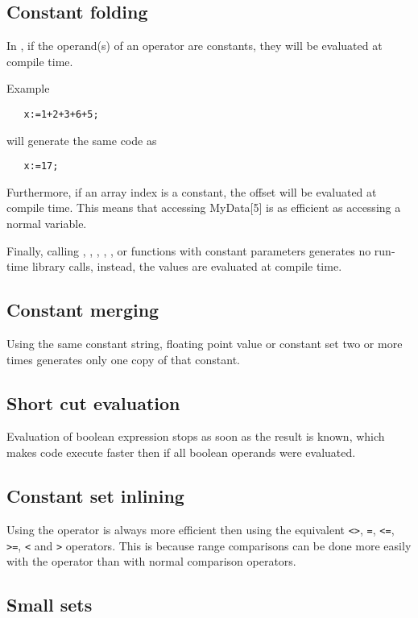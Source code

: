 \subsection{Constant folding}

In \fpc, if the operand(s) of an operator are constants, they
will be evaluated at compile time.

Example

\begin{verbatim}
   x:=1+2+3+6+5;
\end{verbatim}
will generate the same code as
\begin{verbatim}
   x:=17;
\end{verbatim}

Furthermore, if an array index is a constant, the offset will
be evaluated at compile time. This means that accessing MyData[5]
is as efficient as accessing a normal variable.

Finally, calling , , , , ,
or  functions with constant parameters generates no
run-time library calls, instead, the values are evaluated at
compile time.

\subsection{Constant merging}

Using the same constant string, floating point value or constant set 
two or more times generates only one copy of that constant.

\subsection{Short cut evaluation}

Evaluation of boolean expression stops as soon as the result is
known, which makes code execute faster then if all boolean operands
were evaluated.

\subsection{Constant set inlining}

Using the  operator is always more efficient then using the
equivalent \verb|<>|, \verb|=|, \verb|<=|, \verb|>=|, \verb|<| and \verb|>|
operators. This is because range comparisons can be done more easily with
the  operator than with normal comparison operators.

\subsection{Small sets}

